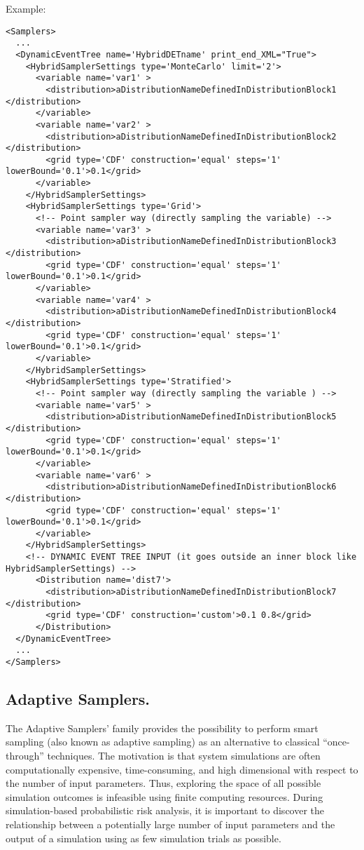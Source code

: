 Example:
\begin{lstlisting}[style=XML]
<Samplers>
  ...
  <DynamicEventTree name='HybridDETname' print_end_XML="True">
    <HybridSamplerSettings type='MonteCarlo' limit='2'>
      <variable name='var1' >
        <distribution>aDistributionNameDefinedInDistributionBlock1 </distribution> 
      </variable>
      <variable name='var2' >
        <distribution>aDistributionNameDefinedInDistributionBlock2 </distribution> 
        <grid type='CDF' construction='equal' steps='1' lowerBound='0.1'>0.1</grid>
      </variable>
    </HybridSamplerSettings>
    <HybridSamplerSettings type='Grid'>
      <!-- Point sampler way (directly sampling the variable) -->
      <variable name='var3' >
        <distribution>aDistributionNameDefinedInDistributionBlock3 </distribution> 
        <grid type='CDF' construction='equal' steps='1' lowerBound='0.1'>0.1</grid>
      </variable>
      <variable name='var4' >
        <distribution>aDistributionNameDefinedInDistributionBlock4 </distribution> 
        <grid type='CDF' construction='equal' steps='1' lowerBound='0.1'>0.1</grid>
      </variable>
    </HybridSamplerSettings>
    <HybridSamplerSettings type='Stratified'>
      <!-- Point sampler way (directly sampling the variable ) -->
      <variable name='var5' >
        <distribution>aDistributionNameDefinedInDistributionBlock5 </distribution> 
        <grid type='CDF' construction='equal' steps='1' lowerBound='0.1'>0.1</grid>
      </variable>
      <variable name='var6' >
        <distribution>aDistributionNameDefinedInDistributionBlock6 </distribution> 
        <grid type='CDF' construction='equal' steps='1' lowerBound='0.1'>0.1</grid>
      </variable>
    </HybridSamplerSettings>
    <!-- DYNAMIC EVENT TREE INPUT (it goes outside an inner block like HybridSamplerSettings) -->
      <Distribution name='dist7'>
        <distribution>aDistributionNameDefinedInDistributionBlock7 </distribution> 
        <grid type='CDF' construction='custom'>0.1 0.8</grid>
      </Distribution>
  </DynamicEventTree>
  ...
</Samplers>
\end{lstlisting}

\subsection{Adaptive Samplers.}
\label{subsec:AdaptSamplers}
The Adaptive Samplers' family provides the possibility to perform smart sampling
(also known as adaptive sampling) as an alternative to classical “once-through”
techniques.
%
The motivation is that system simulations are often computationally expensive,
time-consuming, and high dimensional with respect to the number of input
parameters.
%
Thus, exploring the space of all possible simulation outcomes is infeasible
using finite computing resources.
%
During simulation-based probabilistic risk analysis, it is important to discover
the relationship between a potentially large number of input parameters and the
output of a simulation using as few simulation trials as possible.

